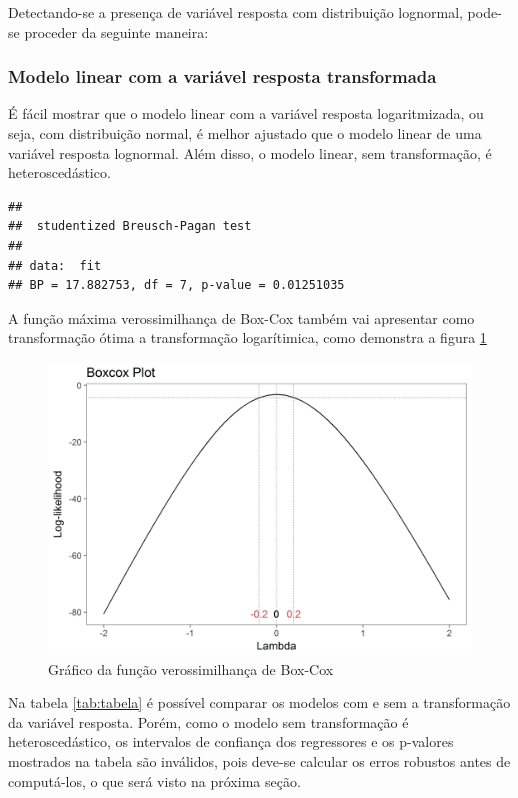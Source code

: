 \documentclass[a4paper]{article}
\begin{document}
Detectando-se a presença de variável resposta com distribuição
lognormal, pode-se proceder da seguinte maneira:

\subsubsection{Modelo linear com a variável resposta
transformada}\label{modelo-linear-com-a-variavel-resposta-transformada}

É fácil mostrar que o modelo linear com a variável resposta
logaritmizada, ou seja, com distribuição normal, é melhor ajustado que o
modelo linear de uma variável resposta lognormal. Além disso, o modelo
linear, sem transformação, é heteroscedástico.

\begin{verbatim}
## 
##  studentized Breusch-Pagan test
## 
## data:  fit
## BP = 17.882753, df = 7, p-value = 0.01251035
\end{verbatim}

A função máxima verossimilhança de Box-Cox também vai apresentar como
transformação ótima a transformação logarítimica, como demonstra a
figura \ref{fig:boxcox}

\begin{figure}[H]

{\centering \includegraphics[width=0.5\linewidth]{images/boxcox-1} 

}

\caption{Gráfico da função verossimilhança de Box-Cox}\label{fig:boxcox}
\end{figure}

Na tabela \ref{tab:tabela} é possível comparar os modelos com e sem a
transformação da variável resposta. Porém, como o modelo sem
transformação é heteroscedástico, os intervalos de confiança dos
regressores e os p-valores mostrados na tabela são inválidos, pois
deve-se calcular os erros robustos antes de computá-los, o que será
visto na próxima seção.
\end{document}
